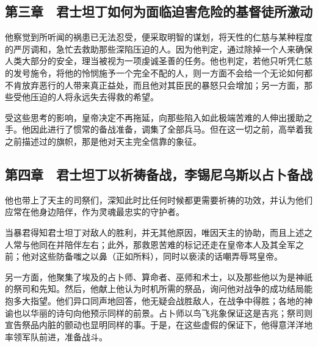 
\subsection{第三章　君士坦丁如何为面临迫害危险的基督徒所激动}

他察觉到所听闻的祸患已无法忍受，便采取明智的谋划，将天性的仁慈与某种程度的严厉调和，急忙去救助那些深陷压迫的人。因为他判定，通过除掉一个人来确保人类大部分的安全，理当被视为一项虔诚圣善的任务。他也判定，若他只听凭仁慈的发号施令，将他的怜悯施予一个完全不配的人，则一方面不会给一个无论如何都不肯放弃恶行的人带来真正益处，而且他对其臣民的暴怒只会增加；另一方面，那些受他压迫的人将永远失去得救的希望。\par

受这些思考的影响，皇帝决定不再拖延，向那些陷入如此极端苦难的人伸出援助之手。他因此进行了惯常的备战准备，调集了全部兵马。但在这一切之前，高举着我之前描述过的旗帜，那是他对天主完全信靠的象征。\par


\subsection{第四章　君士坦丁以祈祷备战，李锡尼乌斯以占卜备战}

他也带上了天主的司祭们，深知此时比任何时候都更需要祈祷的功效，并认为他们应常在他身边陪伴，作为灵魂最忠实的守护者。\par

当暴君得知君士坦丁对敌人的胜利，并无其他原因，唯因天主的协助，而且上述之人常与他同在并陪伴左右；此外，那救恩苦难的标记还走在皇帝本人及其全军之前；他对这些防备嗤之以鼻（正如所料），同时以亵渎的话嘲弄辱骂皇帝。\par

另一方面，他聚集了埃及的占卜师、算命者、巫师和术士，以及那些他以为是神祇的祭司和先知。然后，他献上他认为时机所需的祭品，询问他对战争的成功结局能抱多大指望。他们异口同声地回答，他无疑会战胜敌人，在战争中得胜；各地的神谕也以华丽的诗句向他预示同样的前景。占卜师以鸟飞兆象保证这是吉兆；祭司则宣告祭品内脏的颤动也显明同样的事。于是，在这些虚假的保证下，他得意洋洋地率领军队前进，准备战斗。\par


